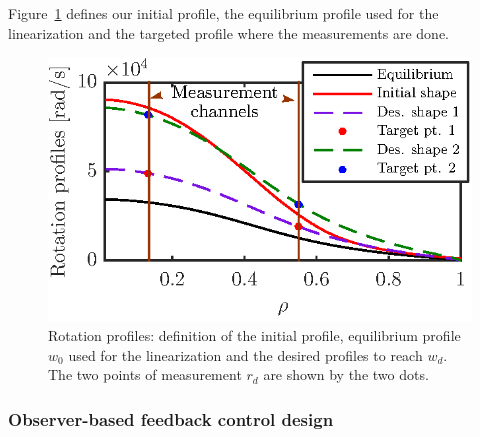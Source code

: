 \documentclass[12pt]{iopart}
\begin{document}
Figure~\ref{fig:rot11} defines our initial profile, the equilibrium profile used for the linearization and the targeted profile where the measurements are done.
\begin{figure}
	\centering
\includegraphics{imene_figs/fig12} %
\caption{Rotation profiles: definition of the initial profile, equilibrium profile $w_0$ used for the linearization and the desired profiles to reach $w_d$. The two points of measurement $r_d$ are shown by the two dots.}
\label{fig:rot11}
\end{figure}




\subsubsection{Observer-based feedback control design} 
\end{document}
